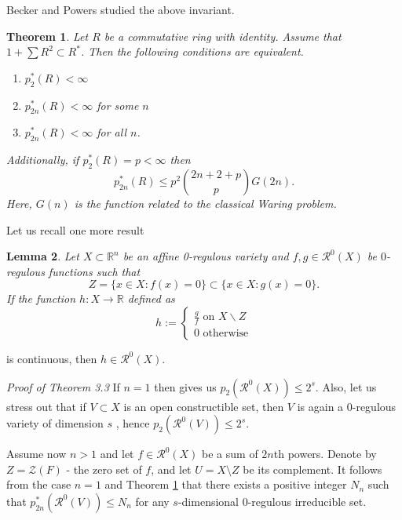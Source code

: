 \documentclass[12pt,reqno]{amsart}   	%
\newtheorem{thm}{Theorem}[section]
\newtheorem{lemma}[thm]{Lemma}
\theoremstyle{remark}
\newcommand{\RR}{\mathcal{R}}
\newcommand{\R}{\mathbb{R}}
\begin{document}
Becker and Powers studied the above invariant.

\begin{thm}\label{Becker Powers}\cite[Theorem 5.17]{bp1996}
Let $R$ be a commutative ring with identity. Assume that $1+\sum R^2 \subset R^*$. Then the following conditions are equivalent.
\begin{enumerate}
\item $p^*_2(R)<\infty$
\item $p^*_{2n}(R) <\infty$ for some $n$
\item $p^*_{2n}(R) <\infty$ for all $n$.
\end{enumerate}
Additionally, if $p^*_2(R)=p < \infty $ then
$$p_{2n}^*(R) \leq p^2 {2n+2+p \choose p}G(2n).$$
Here, $G(n)$ is the function related to the classical Waring problem.
\end{thm}



Let us recall one more result

\begin{lemma}\label{Banecki lemat przedłuzanie}\cite[Lemma 2.8]{bk2023}
Let $X\subset\R^n$ be an affine 0-regulous variety and $f,g\in\RR^0(X)$ be $0$-regulous functions such that
\begin{equation*}
    Z=\{x\in X:f(x)=0\}\subset\{x\in X:g(x)=0\}.
\end{equation*}
If the function $h:X \rightarrow \R$ defined as
\begin{equation*}
    h:=
    \begin{cases}
        \frac{g}{f} \text{ on } X \backslash Z \\
        0 \text{ otherwise}
    \end{cases}
\end{equation*}
\end{lemma}
is continuous, then $h \in\RR^0(X)$.


\noindent
\textit{Proof of Theorem 3.3}
    If $n=1$ then  \cite[Theorem 2.6]{bk2023} gives us $p_2(\RR^0(X)) \leq 2^s$. Also, let us stress out that if $V \subset X$ is an open constructible set, then $V$ is again a $0$-regulous variety of dimension $s$ \cite[Proposition 1.3]{bk2023}, hence $p_2(\RR^0(V)) \leq 2^s$. 


Assume now $n>1$ and let $f \in \RR^0(X)$ be a sum of $2n$th powers. Denote by $Z=\mathcal{Z}(F)$ - the zero set of $f$, and let $U = X\setminus Z$ be its complement.
It follows from the case $n=1$ and Theorem \ref{Becker Powers} that there exists a positive integer $N_n$ such that $p_{2n}^*(\RR^0(V)) \leq N_n$ for any $s$-dimensional $0$-regulous irreducible set.
\end{document}
